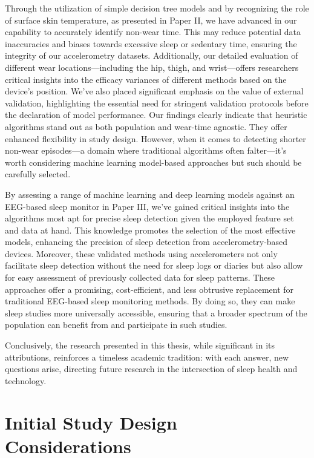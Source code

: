 \documentclass[
  10pt,
]{scrbook}
\begin{document}
Through the utilization of simple decision tree models and by
recognizing the role of surface skin temperature, as presented in Paper
II, we have advanced in our capability to accurately identify non-wear
time. This may reduce potential data inaccuracies and biases towards
excessive sleep or sedentary time, ensuring the integrity of our
accelerometry datasets. Additionally, our detailed evaluation of
different wear locations---including the hip, thigh, and wrist---offers
researchers critical insights into the efficacy variances of different
methods based on the device's position. We've also placed significant
emphasis on the value of external validation, highlighting the essential
need for stringent validation protocols before the declaration of model
performance. Our findings clearly indicate that heuristic algorithms
stand out as both population and wear-time agnostic. They offer enhanced
flexibility in study design. However, when it comes to detecting shorter
non-wear episodes---a domain where traditional algorithms often
falter---it's worth considering machine learning model-based approaches
but such should be carefully selected.

By assessing a range of machine learning and deep learning models
against an EEG-based sleep monitor in Paper III, we've gained critical
insights into the algorithms most apt for precise sleep detection given
the employed feature set and data at hand. This knowledge promotes the
selection of the most effective models, enhancing the precision of sleep
detection from accelerometry-based devices. Moreover, these validated
methods using accelerometers not only facilitate sleep detection without
the need for sleep logs or diaries but also allow for easy assessment of
previously collected data for sleep patterns. These approaches offer a
promising, cost-efficient, and less obtrusive replacement for
traditional EEG-based sleep monitoring methods. By doing so, they can
make sleep studies more universally accessible, ensuring that a broader
spectrum of the population can benefit from and participate in such
studies.

Conclusively, the research presented in this thesis, while significant
in its attributions, reinforces a timeless academic tradition: with each
answer, new questions arise, directing future research in the
intersection of sleep health and technology.

\hypertarget{initial-study-design-considerations}{%
\section{Initial Study Design
Considerations}\label{initial-study-design-considerations}}
\end{document}
